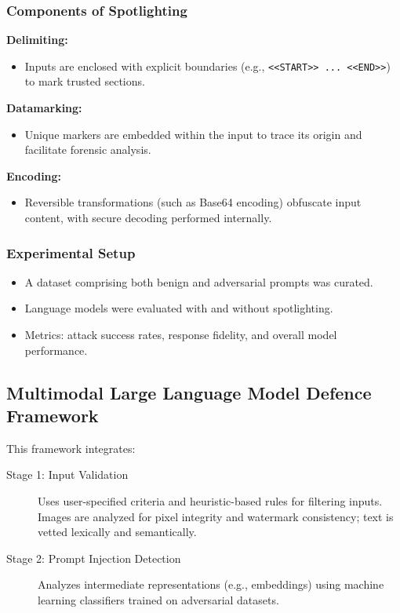 \documentclass[journal]{IEEEtran}  %
\begin{document}
\subsubsection*{Components of Spotlighting\\}
\textbf{Delimiting:}
\begin{itemize}
    \item Inputs are enclosed with explicit boundaries (e.g., \texttt{<<START>> ... <<END>>}) to mark trusted sections.
\end{itemize}
\textbf{Datamarking:}
\begin{itemize}
    \item Unique markers are embedded within the input to trace its origin and facilitate forensic analysis.
\end{itemize}
\textbf{Encoding:}
\begin{itemize}
    \item Reversible transformations (such as Base64 encoding) obfuscate input content, with secure decoding performed internally.
\end{itemize}

\subsubsection*{Experimental Setup}
\begin{itemize}
    \item A dataset comprising both benign and adversarial prompts was curated.
    \item Language models were evaluated with and without spotlighting.
    \item Metrics: attack success rates, response fidelity, and overall model performance.
\end{itemize}

\subsection{Multimodal Large Language Model Defence Framework}
This framework integrates:
\begin{description}
    \item[Stage 1: Input Validation] Uses user-specified criteria and heuristic-based rules for filtering inputs. Images are analyzed for pixel integrity and watermark consistency; text is vetted lexically and semantically.
    \item[Stage 2: Prompt Injection Detection] Analyzes intermediate representations (e.g., embeddings) using machine learning classifiers trained on adversarial datasets.
\end{description}
\end{document}
